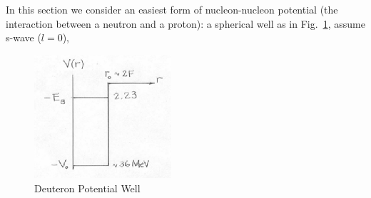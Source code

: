 \documentclass{school-22.101-notes}
\date{October 19, 2011}
\begin{document}
\maketitle


In this section we consider an easiest form of nucleon-nucleon potential (the interaction between a neutron and a proton): a spherical well as in Fig.~\ref{deuteron-potential}, assume s-wave ($l=0$),
\begin{figure}[h!]
    \centering
    \includegraphics[width=2in]{images/deuteron/deuteron-potential.png}
    \caption{Deuteron Potential Well} \label{deuteron-potential}
\end{figure}
\end{document}
